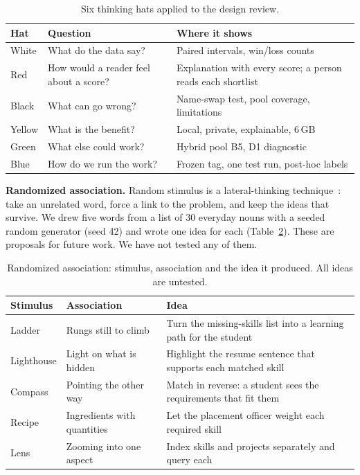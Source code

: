 \documentclass[conference]{IEEEtran}
\begin{document}
\begin{table}[!t]
\caption{Six thinking hats applied to the design review.}
\label{tab:hats}
\centering\footnotesize
\begin{tabular}{p{}p{}p{}}
\toprule
Hat & Question & Where it shows\\
\midrule
White & What do the data say? & Paired intervals, win/loss counts\\
Red & How would a reader feel about a score? & Explanation with every score; a person reads each shortlist\\
Black & What can go wrong? & Name-swap test, pool coverage, limitations\\
Yellow & What is the benefit? & Local, private, explainable, 6\,GB\\
Green & What else could work? & Hybrid pool B5, D1 diagnostic\\
Blue & How do we run the work? & Frozen tag, one test run, post-hoc labels\\
\bottomrule
\end{tabular}
\end{table}

\textbf{Randomized association.} Random stimulus is a lateral-thinking technique~\cite{debono1970lateral}: take an unrelated word, force a link to the problem, and keep the ideas that survive. We drew five words from a list of 30 everyday nouns with a seeded random generator (seed 42) and wrote one idea for each (Table~\ref{tab:random}). These are proposals for future work. We have not tested any of them.

\begin{table}[!t]
\caption{Randomized association: stimulus, association and the idea it produced. All ideas are untested.}
\label{tab:random}
\centering\footnotesize
\begin{tabular}{p{}p{}p{}}
\toprule
Stimulus & Association & Idea\\
\midrule
Ladder & Rungs still to climb & Turn the missing-skills list into a learning path for the student\\
Lighthouse & Light on what is hidden & Highlight the resume sentence that supports each matched skill\\
Compass & Pointing the other way & Match in reverse: a student sees the requirements that fit them\\
Recipe & Ingredients with quantities & Let the placement officer weight each required skill\\
Lens & Zooming into one aspect & Index skills and projects separately and query each\\
\bottomrule
\end{tabular}
\end{table}
\end{document}
